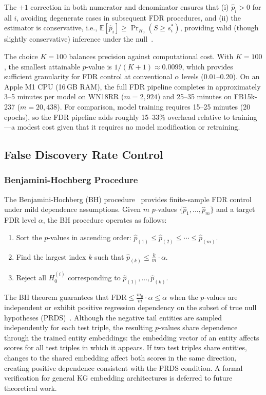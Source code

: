 The $+1$ correction in both numerator and denominator ensures that (i) $\hat{p}_i > 0$ for all $i$, avoiding degenerate cases in subsequent FDR procedures, and (ii) the estimator is conservative, i.e., $\mathbb{E}[\hat{p}_i] \geq \Pr_{H_0}(S \geq s_i^*)$, providing valid (though slightly conservative) inference under the null~\cite{davison1997bootstrap}.

The choice $K = 100$ balances precision against computational cost. With $K = 100$, the smallest attainable $p$-value is $1/(K+1) \approx 0.0099$, which provides sufficient granularity for FDR control at conventional $\alpha$ levels ($0.01$--$0.20$).
On an Apple M1 CPU (16\,GB RAM), the full FDR pipeline completes in approximately 3--5 minutes per model on WN18RR ($m = 2{,}924$) and 25--35 minutes on FB15k-237 ($m = 20{,}438$).
For comparison, model training requires 15--25 minutes (20 epochs), so the FDR pipeline adds roughly 15--33\% overhead relative to training---a modest cost given that it requires no model modification or retraining.

\subsection{False Discovery Rate Control}
\label{subsec:bh}

\subsubsection{Benjamini-Hochberg Procedure}
\label{subsec:bh-procedure}

The Benjamini-Hochberg (BH) procedure~\cite{benjamini1995controlling} provides finite-sample FDR control under mild dependence assumptions.
Given $m$ $p$-values $\{\hat{p}_1, \dots, \hat{p}_m\}$ and a target FDR level $\alpha$, the BH procedure operates as follows:
\begin{enumerate}
    \item Sort the $p$-values in ascending order: $\hat{p}_{(1)} \leq \hat{p}_{(2)} \leq \cdots \leq \hat{p}_{(m)}$.
    \item Find the largest index $k$ such that $\hat{p}_{(k)} \leq \frac{k}{m} \cdot \alpha$.
    \item Reject all $H_0^{(i)}$ corresponding to $\hat{p}_{(1)}, \dots, \hat{p}_{(k)}$.
\end{enumerate}

The BH theorem guarantees that $\text{FDR} \leq \frac{m_0}{m} \cdot \alpha \leq \alpha$ when the $p$-values are independent or exhibit positive regression dependency on the subset of true null hypotheses (PRDS)~\cite{benjamini2001control}.
Although the negative tail entities are sampled independently for each test triple, the resulting $p$-values share dependence through the trained entity embeddings: the embedding vector of an entity affects scores for all test triples in which it appears.
If two test triples share entities, changes to the shared embedding affect both scores in the same direction, creating positive dependence consistent with the PRDS condition.
A formal verification for general KG embedding architectures is deferred to future theoretical work.

